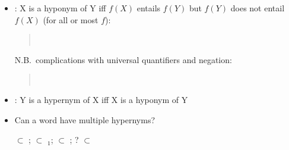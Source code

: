 \documentclass[headrule,footrule]{foils}
\begin{document}

\begin{itemize}
\item {}: X is a hyponym of Y iff
  $f(X)$ entails $f(Y)$ but $f(Y)$ does not entail $f(X)$ (for all or most $f$):
  \begin{quote}
    \\
  \end{quote}
  N.B.\ complications with universal quantifiers and negation:
  \begin{quote}
    \\
  \end{quote}
\item {}: Y is a hypernym of X iff X is a hyponym of Y
\item Can a word have multiple hypernyms?
  \begin{exe}
    \ex {} $\subset$ ; $\subset$ $_1$; 
    $\subset$ ; ? $\subset$ 
  \end{exe}
\end{itemize}
\end{document}
